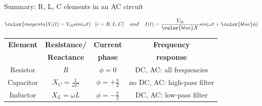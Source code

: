 %
%
%

\begin{frame}{Summary: R, L, C elements in an AC circuit}

\begin{equation*}
{\color{magenta}
     V_i(t) = {V_i}_0 sin(\omega t) \;\;\; [i=R,L,C]
     \;\;\;\; and \;\;\;\;
     I(t) = \frac{{V_i}_0}{ {\color{blue}X}} sin(\omega t + {\color{blue}\phi})
}
\end{equation*}

\setlength{\extrarowheight}{12pt}
\setlength{\arraycolsep}{5pt}

 \begin{center}
 {

  \begin{table}[H]
    \begin{tabular}{|c|c|c|c|}
      \hline
        {\bf Element} & {\bf Resistance/} & {\bf Current} & {\bf Frequency} \\
                      & {\bf Reactance}   & {\bf phase}    & {\bf response} \\
      \hline
        Resistor  &
            $\displaystyle R$  &
            $\displaystyle \phi = 0$  &
            DC, AC: all frequencies \\
        Capacitor &
            $\displaystyle X_C = \frac{1}{\omega C}$  &
            $\displaystyle \phi = +\frac{\pi}{2}$  &
            no DC, AC: high-pass filter \\
        Inductor  &
            $\displaystyle X_L = \omega L$  &
            $\displaystyle \phi = -\frac{\pi}{2}$   &
            DC, AC: low-pass filter \\
      \hline
    \end{tabular}
  \end{table}

 }
 \end{center}

\end{frame}


%
%
%

